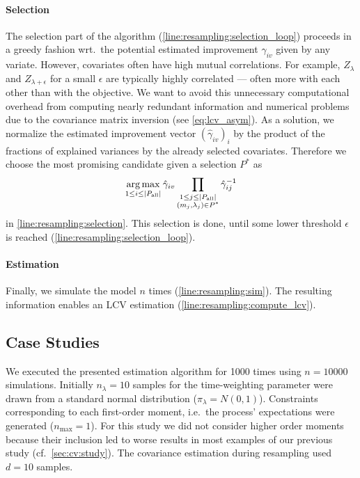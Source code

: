 \paragraph{Selection} The selection part of the algorithm
(\autoref{line:resampling:selection_loop}) proceeds in a greedy
fashion wrt.\ the potential estimated improvement $\hat{\gamma}_{iv}$
given by any variate.
However, covariates often have high mutual correlations.
For example, $Z_{\lambda}$ and $Z_{\lambda+\epsilon}$ for a small
$\epsilon$ are typically highly correlated --- often more with each
other than with the objective.
We want to avoid this unnecessary computational overhead from
computing nearly redundant information and numerical problems due to
the covariance matrix inversion (see \eqref{eq:lcv_asym}).
As a solution, we normalize the estimated improvement vector
$(\hat{\gamma}_{iv})_i$ by
the product of the fractions of explained variances by the already
selected covariates.
Therefore we choose the most promising candidate given a selection $P^{*}$ as
\begin{equation}
  \operatorname*{arg\,max}_{1\leq i \leq \left|P_{\text{all}}\right|}
  \hat{\gamma}_{iv}
  \prod_{\substack{1\leq j\leq {\left|P_{\text{all}}\right|}\\(m_j,
  \lambda_j)\in P^*}}
  \hat{\gamma}_{ij}^{-1}
\end{equation}
in \autoref{line:resampling:selection}.
This selection is done, until some lower threshold
$\epsilon$ is reached
(\autoref{line:resampling:selection_loop}).

\paragraph{Estimation} Finally, we simulate the model $n$ times
(\autoref{line:resampling:sim}).
The resulting information enables an LCV estimation
(\autoref{line:resampling:compute_lcv}).

\subsection{Case Studies}
We executed the presented estimation algorithm for \num{1000} times
using $n=\num{10000}$ simulations.
Initially $n_{\lambda}=10$ samples for the time-weighting parameter
were drawn from a standard normal distribution ($\pi_{\lambda} = N(0,1)$).
Constraints corresponding to each first-order moment, i.e.\ the
process' expectations were generated ($n_{\max}=1$).
For this study we did not consider higher order moments because their
inclusion led to worse results in most examples of our previous study
(cf.\ \autoref{sec:cv:study}).
The covariance estimation during resampling used $d=10$ samples.

